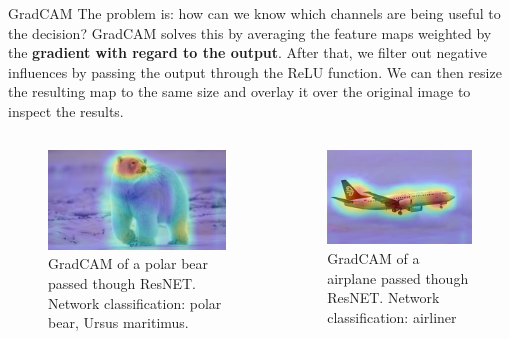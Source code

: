 \documentclass[final]{beamer}
\newlength{\colwidth}
\begin{document}
\begin{frame}[t]
\begin{columns}[t]
\begin{column}{\colwidth}
\begin{block}{GradCAM}
    The problem is: how can we know which channels are being useful to the decision? GradCAM solves this by averaging the feature maps weighted by the \textbf{gradient with regard to the output}. After that, we filter out negative influences by passing the output through the ReLU function. We can then resize the resulting map to the same size and overlay it over the original image to inspect the results.
    
    \begin{columns}  
      \begin{column}{0.5\textwidth}
        \begin{figure}
          \centering
          \includegraphics[width=\linewidth]{images/GC_ursopolar.png}
          \caption{GradCAM of a polar bear passed though ResNET. Network classification: polar bear, Ursus maritimus.}
        \end{figure}  
      \end{column}

      \begin{column}{0.5\textwidth}
        \begin{figure}
          \centering
          \includegraphics[width=\linewidth]{images/GC_aviao.png}
          \caption{GradCAM of a airplane passed though ResNET. Network classification: airliner}
        \end{figure}
      \end{column}
      

\end{columns}
\end{block}
\end{column}
\end{columns}
\end{frame}
\end{document}
